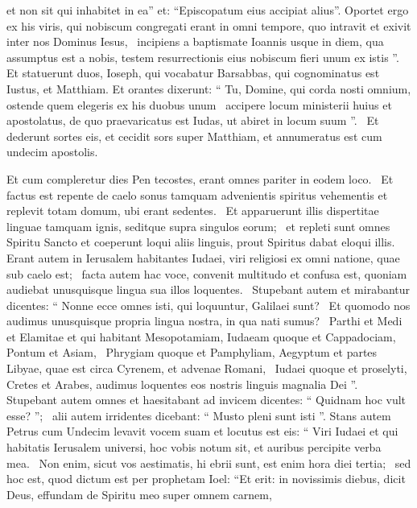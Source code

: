 \begin{biblechapter}
 et non sit qui inhabitet in ea”
 et: “Episcopatum eius accipiat alius”.
 \verse Oportet ergo ex his viris, qui nobiscum congregati erant in omni tempore, quo intravit et exivit inter nos Dominus Iesus, 
 \verse incipiens a baptismate Ioannis usque in diem, qua assumptus est a nobis, testem resurrectionis eius nobiscum fieri unum ex istis ”.
 \verse Et statuerunt duos, Ioseph, qui vocabatur Barsabbas, qui cognominatus est Iustus, et Matthiam.
\verse Et orantes dixerunt: “ Tu, Domine, qui corda nosti omnium, ostende quem elegeris ex his duobus unum 
 \verse accipere locum ministerii huius et apostolatus, de quo praevaricatus est Iudas, ut abiret in locum suum ”. 
 \verse Et dederunt sortes eis, et cecidit sors super Matthiam, et annumeratus est cum undecim apostolis.
 
\begin{biblechapter}
 \verse Et cum compleretur dies Pen tecostes, erant omnes pariter in eodem loco. 
 \verse Et factus est repente de caelo sonus tamquam advenientis spiritus vehementis et replevit totam domum, ubi erant sedentes. 
 \verse Et apparuerunt illis dispertitae linguae tamquam ignis, seditque supra singulos eorum; 
 \verse et repleti sunt omnes Spiritu Sancto et coeperunt loqui aliis linguis, prout Spiritus dabat eloqui illis.
 \verse Erant autem in Ierusalem habitantes Iudaei, viri religiosi ex omni natione, quae sub caelo est; 
 \verse facta autem hac voce, convenit multitudo et confusa est, quoniam audiebat unusquisque lingua sua illos loquentes. 
 \verse Stupebant autem et mirabantur dicentes: “ Nonne ecce omnes isti, qui loquuntur, Galilaei sunt? 
 \verse Et quomodo nos audimus unusquisque propria lingua nostra, in qua nati sumus? 
 \verse Parthi et Medi et Elamitae et qui habitant Mesopotamiam, Iudaeam quoque et Cappadociam, Pontum et Asiam, 
 \verse Phrygiam quoque et Pamphyliam, Aegyptum et partes Libyae, quae est circa Cyrenem, et advenae Romani, 
 \verse Iudaei quoque et proselyti, Cretes et Arabes, audimus loquentes eos nostris linguis magnalia Dei ”. 
 \verse Stupebant autem omnes et haesitabant ad invicem dicentes: “ Quidnam hoc vult esse? ”; 
 \verse alii autem irridentes dicebant: “ Musto pleni sunt isti ”.
 \verse Stans autem Petrus cum Undecim levavit vocem suam et locutus est eis: “ Viri Iudaei et qui habitatis Ierusalem universi, hoc vobis notum sit, et auribus percipite verba mea. 
 \verse Non enim, sicut vos aestimatis, hi ebrii sunt, est enim hora diei tertia; 
 \verse sed hoc est, quod dictum est per prophetam Ioel:
 \verse “Et erit: in novissimis diebus, dicit Deus,
 effundam de Spiritu meo super omnem carnem,

\end{biblechapter}
\end{biblechapter}
